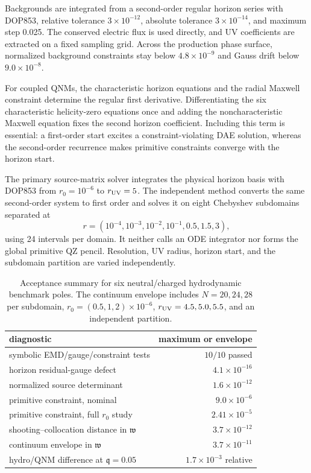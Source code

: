 \documentclass[11pt,a4paper]{article}
\newcommand{\w}{\mathfrak{w}}
\newcommand{\q}{\mathfrak{q}}
\begin{document}
Backgrounds are integrated from a second-order regular horizon series with
DOP853, relative tolerance $3\times10^{-12}$, absolute tolerance
$3\times10^{-14}$, and maximum step 0.025.  The conserved electric flux is
used directly, and UV coefficients are extracted on a fixed sampling grid.
Across the production phase surface, normalized background constraints stay
below $4.8\times10^{-9}$ and Gauss drift below $9.0\times10^{-8}$.

For coupled QNMs, the characteristic horizon equations and the radial Maxwell
constraint determine the regular first derivative.  Differentiating the six
characteristic helicity-zero equations once and adding the noncharacteristic
Maxwell equation fixes the second horizon coefficient.  Including this term
is essential: a first-order start excites a constraint-violating DAE solution,
whereas the second-order recurrence makes primitive constraints converge with
the horizon start.

The primary source-matrix solver integrates the physical horizon basis with
DOP853 from $r_0=10^{-6}$ to $r_{\rm UV}=5$.  The independent method converts
the same second-order system to first order and solves it on eight Chebyshev
subdomains separated at
\begin{equation}
 r=(10^{-4},10^{-3},10^{-2},10^{-1},0.5,1.5,3),
\end{equation}
using 24 intervals per domain.  It neither calls an ODE integrator nor forms
the global primitive QZ pencil.  Resolution, UV radius, horizon start, and the
subdomain partition are varied independently.

\begin{table}[t]
 \centering
 \caption{Acceptance summary for six neutral/charged hydrodynamic benchmark
 poles.  The continuum envelope includes $N=20,24,28$ per subdomain,
 $r_0=(0.5,1,2)\times10^{-6}$, $r_{\rm UV}=4.5,5.0,5.5$, and an independent
 partition.}
 \label{tab:coupled-validation}
 \begin{tabular}{@{}lr@{}}
 \toprule
 diagnostic & maximum or envelope\\
 \midrule
 symbolic EMD/gauge/constraint tests & $10/10$ passed\\
 horizon residual-gauge defect & $4.1\times10^{-16}$\\
 normalized source determinant & $1.6\times10^{-12}$\\
 primitive constraint, nominal & $9.0\times10^{-6}$\\
 primitive constraint, full $r_0$ study & $2.41\times10^{-5}$\\
 shooting--collocation distance in $\w$ & $3.7\times10^{-12}$\\
 continuum envelope in $\w$ & $3.7\times10^{-11}$\\
 hydro/QNM difference at $\q=0.05$ & $1.7\times10^{-3}$ relative\\
 \bottomrule
 \end{tabular}
\end{table}
\end{document}
